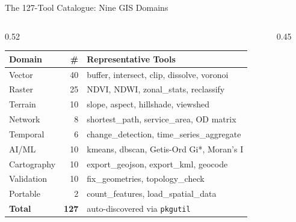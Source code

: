 \documentclass[aspectratio=169,11pt]{beamer}
\begin{document}
\begin{frame}{The 127-Tool Catalogue: Nine GIS Domains}
  \centering\footnotesize
  \begin{columns}[T,onlytextwidth]
    \begin{column}{0.52\textwidth}
      \begin{tabular}{@{}lrl@{}}
        \toprule
        \textbf{Domain} & \textbf{\#} & \textbf{Representative Tools} \\ \midrule
        \rowcolor{geosinavy!10} Vector & 40 & buffer, intersect, clip, dissolve, voronoi \\
        \rowcolor{geositeal!10} Raster & 25 & NDVI, NDWI, zonal\_stats, reclassify \\
        \rowcolor{geosigreen!10} Terrain & 10 & slope, aspect, hillshade, viewshed \\
        \rowcolor{geosiamber!10} Network & 8 & shortest\_path, service\_area, OD matrix \\
        \rowcolor{geosired!10} Temporal & 6 & change\_detection, time\_series\_aggregate \\
        \rowcolor{geositeal!10} AI/ML & 10 & kmeans, dbscan, Getis-Ord Gi*, Moran's I \\
        \rowcolor{geosinavy!10} Cartography & 10 & export\_geojson, export\_kml, geocode \\
        \rowcolor{geosimuted!10} Validation & 10 & fix\_geometries, topology\_check \\
        \rowcolor{geosigreen!10} Portable & 2 & count\_features, load\_spatial\_data \\ \midrule
        \textbf{Total} & \textbf{127} & auto-discovered via \texttt{pkgutil} \\
        \bottomrule
      \end{tabular}
    \end{column}
    \begin{column}{0.45\textwidth}
\end{column}
\end{columns}
\end{frame}
\end{document}
